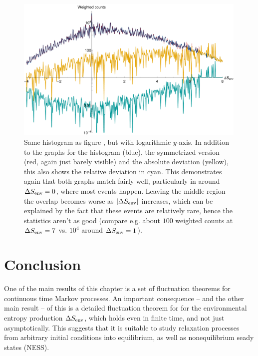 \begin{figure}[htbp]
	\centering
	\includegraphics[width=30em]{figures/histogram_log}
	\caption[]{Same histogram as figure , but with logarithmic \(y\)-axis. In addition to the graphs for the histogram ({\color{blue}blue}), the symmetrized version ({\color{red}red}, again just barely visible) and the absolute deviation ({\color{yellow}yellow}), this also shows the relative deviation in {\color{cyan}cyan}. This demonstrates again that both graphs match fairly well, particularly in around \(\Delta S_\text{env} = 0\), where most events happen. Leaving the middle region the overlap becomes worse as \(|\Delta S_\text{env}|\) increases, which can be explained by the fact that these events are relatively rare, hence the statistics aren't as good (compare e.g. about \(100\) weighted counts at \(\Delta S_\text{env} = 7\) vs. \(10^4\) around \(\Delta S_\text{env} = 1\)).}
	\label{fig:histogram_log}
\end{figure}







\section{Conclusion}

One of the main results of this chapter is a set of fluctuation theorems for continuous time Markov processes. An important consequence -- and the other main result -- of this is a detailed fluctuation theorem for for the environmental entropy production \(\Delta S_\text{env}\), which holds even in finite time, and not just asymptotically. This suggests that it is suitable to study relaxation processes from arbitrary initial conditions into equilibrium, as well as nonequilibrium seady states (NESS).


